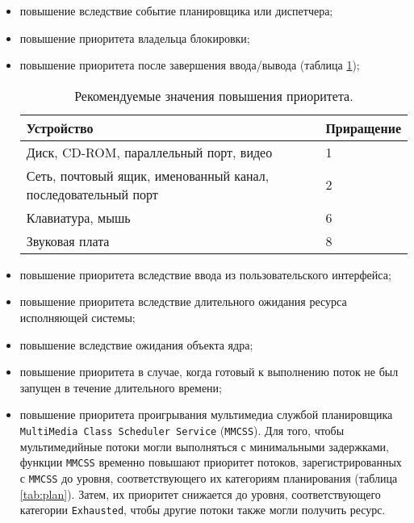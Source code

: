 \begin{itemize}
    \item повышение вследствие событие планировщика или диспетчера;
    \item повышение приоритета владельца блокировки;
    \item повышение приоритета после завершения ввода/вывода (таблица
          \ref{tab:io});
\begin{table}[h]
    \caption{Рекомендуемые значения повышения приоритета.}
    \begin{center}
        \begin{tabular}{|p{100mm}|l|}
            \hline
            \textbf{Устройство} & \textbf{Приращение} \\
            \hline
            Диск, CD-ROM, параллельный порт, видео & 1 \\
            \hline
            Сеть, почтовый ящик, именованный канал, последовательный порт & 2 \\
            \hline
            Клавиатура, мышь & 6 \\
            \hline
            Звуковая плата & 8 \\
            \hline
        \end{tabular}
    \end{center}
    \label{tab:io}
\end{table}
    \item повышение приоритета вследствие ввода из пользовательского интерфейса;
    \item повышение приоритета вследствие длительного ожидания ресурса
          исполняющей системы;
    \item повышение вследствие ожидания объекта ядра;
    \item повышение приоритета в случае, когда готовый к выполнению поток не
          был запущен в течение длительного времени;
    \item повышение приоритета проигрывания мультимедиа службой планировщика
          \texttt{MultiMedia Class Scheduler Service} (\texttt{MMCSS}).
          Для того, чтобы мультимедийные потоки могли выполняться с
          минимальными задержками, функции \texttt{MMCSS} временно повышают
          приоритет потоков, зарегистрированных с \texttt{MMCSS} до уровня,
          соответствующего их категориям планирования (таблица \ref{tab:plan}).
          Затем, их приоритет снижается до уровня, соответствующего категории
          \texttt{Exhausted}, чтобы другие потоки также могли получить ресурс.
\end{itemize}

